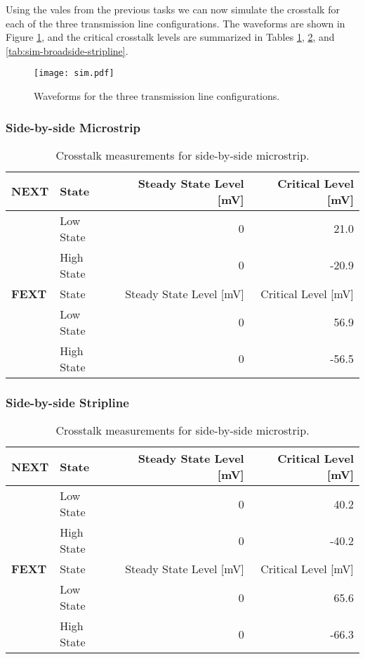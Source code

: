 \documentclass[../main.tex]{subfiles}
\begin{document}
\solution

Using the vales from the previous tasks we can now simulate the crosstalk for each of the three transmission line configurations. The waveforms are shown in Figure \ref{fig:waveforms}, and the critical crosstalk levels are summarized in Tables \ref{tab:sim-side-by-side-microstrip}, \ref{tab:sim-side-by-side-stripline}, and \ref{tab:sim-broadside-stripline}.

\begin{figure}[h]
    \centering
    \texttt{[image: sim.pdf]}
    \caption{Waveforms for the three transmission line configurations.}
    \label{fig:waveforms}
\end{figure}

\subsubsection{Side-by-side Microstrip}

\begin{table}[h]
    \centering
    \begin{tabular}{l l|r r}
        \toprule[1pt]
        \textbf{NEXT} & State & Steady State Level [mV] & Critical Level [mV] \\
        \midrule
        & Low State & 0 & 21.0 \\
        & High State & 0 & -20.9 \\
        \midrule[1pt]
        \textbf{FEXT} & State & Steady State Level [mV] & Critical Level [mV] \\
        \midrule
        & Low State & 0 & 56.9 \\
        & High State & 0 & -56.5 \\
        \bottomrule[1pt]
    \end{tabular}
    \caption{Crosstalk measurements for side-by-side microstrip.}
    \label{tab:sim-side-by-side-microstrip}
\end{table}

\newpage

\subsubsection{Side-by-side Stripline}

\begin{table}[h]
    \centering
    \begin{tabular}{l l|r r}
        \toprule[1pt]
        \textbf{NEXT} & State & Steady State Level [mV] & Critical Level [mV] \\
        \midrule
        & Low State & 0 & 40.2 \\
        & High State & 0 & -40.2 \\
        \midrule[1pt]
        \textbf{FEXT} & State & Steady State Level [mV] & Critical Level [mV] \\
        \midrule
        & Low State & 0 & 65.6 \\
        & High State & 0 & -66.3 \\
        \bottomrule[1pt]
    \end{tabular}
    \caption{Crosstalk measurements for side-by-side microstrip.}
    \label{tab:sim-side-by-side-stripline}
\end{table}
\end{document}
